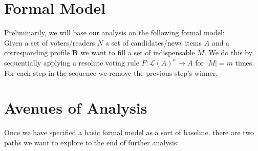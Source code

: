 \documentclass[10pt,a4paper, english]{article}
\begin{document}
\section{Formal Model}
Preliminarily, we will base our analysis on the following formal model:\\
Given a set of voters/readers $N$ a set of candidates/news items $A$ and a corresponding profile $\mathbf{R}$ we want to fill a set of indispensable $M$. We do this by sequentially applying a resolute voting rule $F:\mathcal{L}(A)^n \rightarrow A$ for $|M|=m$ times. For each step in the sequence we remove the previous step's winner.

\section{Avenues of Analysis}
Once we have specified a basic formal model as a sort of baseline, there are two paths we want to explore to the end of further analysis:
\end{document}
